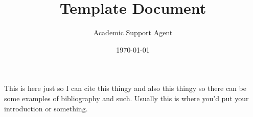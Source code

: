 \documentclass{article}
\title{Template Document}
\author{Academic Support Agent}
\date{\today}
\begin{document}
\maketitle

\maketitlepage
\newpage


\newpage

\begin{abstract}
	\blindtext[3] %
\end{abstract}
\newpage

\makeheader	%
\maketitle	%

This is here just so I can cite this thingy \cite{Kavanaugh1976} and also this thingy \cite{Saussure1995} so there can be some examples of bibliography and such. Usually this is where you'd put your introduction or something.
\blinddocument

\newpage
\makeworkscited
\end{document}
